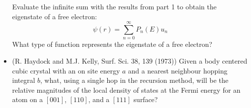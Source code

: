 \begin{itemize}
Evaluate the infinite sum with the results from part 1 to obtain the eigenstate
of a free electron:
%
\begin{equation}
\psi(r) = \sum_{n=0}^{\infty}P_{n}(E)u_{n}
\end{equation}
%
What type of function represents the eigenstate of a free electron?

\item (R. Haydock and M.J. Kelly, Surf. Sci. 38, 139 (1973)) Given a body centered cubic crystal with an 
      on site energy $a$ and a nearest neighbour hopping integral
      $b$, what, using a single hop in the recursion method, will be the relative 
      magnitudes of the local density of states 
      at the Fermi energy for an atom on a $[001]$, $[110]$, and a $[111]$ surface?

\end{itemize}
